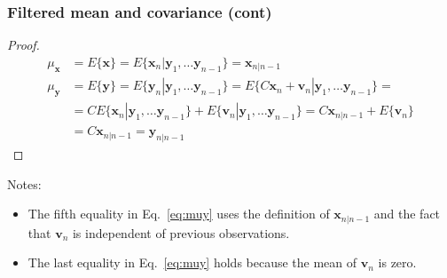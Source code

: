 \begin{frame}
    \frametitle{Filtered mean and covariance (cont)}
    \scriptsize

    \begin{proof}\renewcommand{\qedsymbol}{}
    \begin{align}
        \mu_{\mathbf{x}}&=E\{\mathbf{x}\}=E\{\mathbf{x}_n|\mathbf{y}_1,\ldots\mathbf{y}_{n-1}\}=\mathbf{x}_{n|n-1}\label{eq:mux}\\
        \mu_{\mathbf{y}}&=E\{\mathbf{y}\}=E\{\mathbf{y}_n|\mathbf{y}_1,\ldots\mathbf{y}_{n-1}\}=E\{C\mathbf{x}_n+\mathbf{v}_n|\mathbf{y}_1,\ldots\mathbf{y}_{n-1}\}=\nonumber\\
             &=CE\{\mathbf{x}_n|\mathbf{y}_1,\ldots\mathbf{y}_{n-1}\}+E\{\mathbf{v}_n|\mathbf{y}_1,\ldots\mathbf{y}_{n-1}\}=C\mathbf{x}_{n|n-1}+E\{\mathbf{v}_n\}\nonumber\\
             &=C\mathbf{x}_{n|n-1}=\mathbf{y}_{n|n-1}\label{eq:muy}
    \end{align}
    \end{proof}

    Notes:

    \begin{itemize}
        \item The fifth equality in Eq.~\ref{eq:muy} uses the definition
            of $\mathbf{x}_{n|n-1}$ and the fact that $\mathbf{v}_n$ is
            independent of previous observations.

        \item The last equality in Eq.~\ref{eq:muy} holds because the mean of
            $\mathbf{v}_n$ is zero.
    \end{itemize}

    \normalsize
\end{frame}

